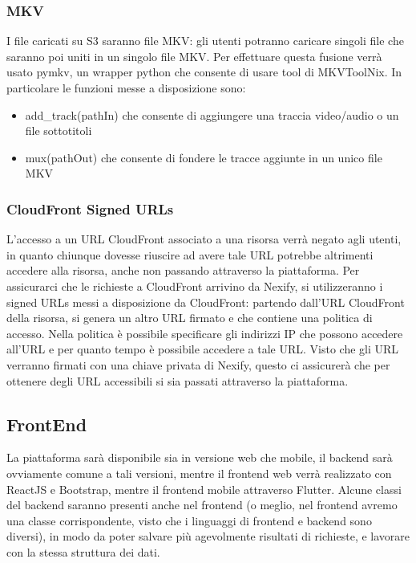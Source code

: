 \subsubsection{MKV}
I file caricati su S3 saranno file MKV: gli utenti potranno caricare singoli file che saranno poi uniti in un singolo file MKV. Per effettuare questa fusione verrà usato pymkv, un wrapper python che consente di usare tool di MKVToolNix. In particolare le funzioni messe a disposizione sono:
\begin{itemize}
\item add\_track(pathIn) che consente di aggiungere una traccia video/audio o un file sottotitoli
\item mux(pathOut) che consente di fondere le tracce aggiunte in un unico file MKV
\end{itemize}
\subsubsection{CloudFront Signed URLs}
L'accesso a un URL CloudFront associato a una risorsa verrà negato agli utenti, in quanto chiunque dovesse riuscire ad avere tale URL potrebbe altrimenti accedere alla risorsa, anche non passando attraverso la piattaforma. Per assicurarci che le richieste a CloudFront arrivino da Nexify, si utilizzeranno i signed URLs messi a disposizione da CloudFront: partendo dall'URL CloudFront della risorsa, si genera un altro URL firmato e che contiene una politica di accesso. Nella politica è possibile specificare gli indirizzi IP che possono accedere all'URL e per quanto tempo è possibile accedere a tale URL. Visto che gli URL verranno firmati con una chiave privata di Nexify, questo ci assicurerà che per ottenere degli URL accessibili si sia passati attraverso la piattaforma.
\subsection{FrontEnd}
La piattaforma sarà disponibile sia in versione web che mobile, il backend sarà ovviamente comune a tali versioni, mentre il frontend web verrà realizzato con ReactJS e Bootstrap, mentre il frontend mobile attraverso Flutter. Alcune classi del backend saranno presenti anche nel frontend (o meglio, nel frontend avremo una classe corrispondente, visto che i linguaggi di frontend e backend sono diversi), in modo da poter salvare più agevolmente risultati di richieste, e lavorare con la stessa struttura dei dati.
